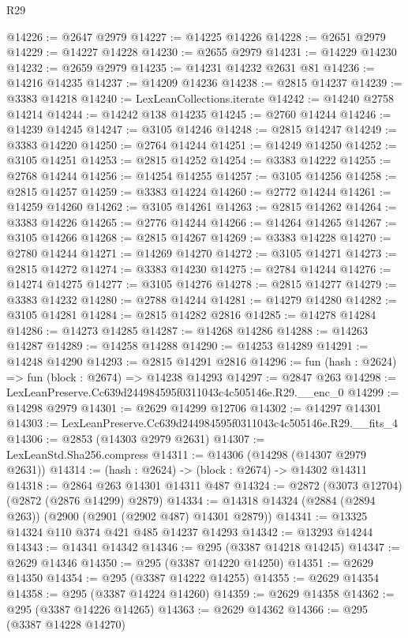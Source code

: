 \begin{lexlean}{R29}
\begin{coremodule}
@14226 := @2647 @2979
@14227 := @14225 @14226
@14228 := @2651 @2979
@14229 := @14227 @14228
@14230 := @2655 @2979
@14231 := @14229 @14230
@14232 := @2659 @2979
@14235 := @14231 @14232 @2631 @81
@14236 := @14216 @14235
@14237 := @14209 @14236
@14238 := @2815 @14237
@14239 := @3383 @14218
@14240 := LexLeanCollections.iterate
@14242 := @14240 @2758 @14214
@14244 := @14242 @138 @14235
@14245 := @2760 @14244
@14246 := @14239 @14245
@14247 := @3105 @14246
@14248 := @2815 @14247
@14249 := @3383 @14220
@14250 := @2764 @14244
@14251 := @14249 @14250
@14252 := @3105 @14251
@14253 := @2815 @14252
@14254 := @3383 @14222
@14255 := @2768 @14244
@14256 := @14254 @14255
@14257 := @3105 @14256
@14258 := @2815 @14257
@14259 := @3383 @14224
@14260 := @2772 @14244
@14261 := @14259 @14260
@14262 := @3105 @14261
@14263 := @2815 @14262
@14264 := @3383 @14226
@14265 := @2776 @14244
@14266 := @14264 @14265
@14267 := @3105 @14266
@14268 := @2815 @14267
@14269 := @3383 @14228
@14270 := @2780 @14244
@14271 := @14269 @14270
@14272 := @3105 @14271
@14273 := @2815 @14272
@14274 := @3383 @14230
@14275 := @2784 @14244
@14276 := @14274 @14275
@14277 := @3105 @14276
@14278 := @2815 @14277
@14279 := @3383 @14232
@14280 := @2788 @14244
@14281 := @14279 @14280
@14282 := @3105 @14281
@14284 := @2815 @14282 @2816
@14285 := @14278 @14284
@14286 := @14273 @14285
@14287 := @14268 @14286
@14288 := @14263 @14287
@14289 := @14258 @14288
@14290 := @14253 @14289
@14291 := @14248 @14290
@14293 := @2815 @14291 @2816
@14296 := fun (hash : @2624) => fun (block : @2674) => @14238 @14293
@14297 := @2847 @263
@14298 := LexLeanPreserve.Cc639d244984595f0311043c4c505146e.R29.__enc_0
@14299 := @14298 @2979
@14301 := @2629 @14299 @12706
@14302 := @14297 @14301
@14303 := LexLeanPreserve.Cc639d244984595f0311043c4c505146e.R29.__fits_4
@14306 := @2853 (@14303 @2979 @2631)
@14307 := LexLeanStd.Sha256.compress
@14311 := @14306 (@14298 (@14307 @2979 @2631))
@14314 := (hash : @2624) -> (block : @2674) -> @14302 @14311
@14318 := @2864 @263 @14301 @14311 @487
@14324 := @2872 (@3073 @12704) (@2872 (@2876 @14299) @2879)
@14334 := @14318 @14324 (@2884 (@2894 @263)) (@2900 (@2901 (@2902 @487) @14301 @2879))
@14341 := @13325 @14324 @110 @374 @421 @485 @14237 @14293
@14342 := @13293 @14244
@14343 := @14341 @14342
@14346 := @295 (@3387 @14218 @14245)
@14347 := @2629 @14346
@14350 := @295 (@3387 @14220 @14250)
@14351 := @2629 @14350
@14354 := @295 (@3387 @14222 @14255)
@14355 := @2629 @14354
@14358 := @295 (@3387 @14224 @14260)
@14359 := @2629 @14358
@14362 := @295 (@3387 @14226 @14265)
@14363 := @2629 @14362
@14366 := @295 (@3387 @14228 @14270)

\end{coremodule}
\end{lexlean}

